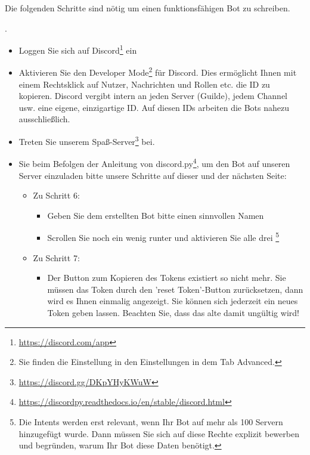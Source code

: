 \documentclass{ubo_tex_uebungszettel/uebungszettel}
\theoremstyle{definition}
\newcommand{\pp}[1]{\lpl{#1}}
\newcommand{\furl}[1]{\footnote{\url{#1}}}
\begin{document}
	\begin{aufg}[Vorbereitung]\quad
		
		\noindent Die folgenden Schritte sind nötig um einen funktionsfähigen Bot zu schreiben.
		
		\medskip
		
		\noindent{}.
		\begin{itemize}
			\item Loggen Sie sich auf Discord\furl{https://discord.com/app} ein
			
			\item Aktivieren Sie den Developer Mode\footnote{Sie finden die Einstellung in den Einstellungen in dem Tab  \glqq Advanced\grqq.} für Discord.
			Dies ermöglicht Ihnen mit einem Rechtsklick auf Nutzer, Nachrichten und Rollen etc. die ID zu kopieren.
			Discord vergibt intern an jeden Server (Guilde), jedem Channel usw. eine eigene, einzigartige ID. Auf diesen IDs arbeiten die Bots nahezu ausschließlich.
			
			\item Treten Sie unserem Spaß-Server\furl{https://discord.gg/DKpYHyKWuW} bei.
		\end{itemize}
		
		\pagebreak
		
		\noindent{}
		\begin{itemize}
			\item {} Sie beim Befolgen der Anleitung von discord.py\furl{https://discordpy.readthedocs.io/en/stable/discord.html}, um den Bot auf unseren Server einzuladen bitte unsere  Schritte auf dieser und der nächsten Seite:
			\begin{itemize}
				
				\item Zu Schritt 6:
				\begin{itemize}
					\item Geben Sie dem erstellten Bot bitte einen sinnvollen Namen
					\item Scrollen Sie noch ein wenig runter und aktivieren Sie alle drei \pp{Privileged Gateway Intents}\footnote{Die Intents werden erst relevant, wenn Ihr Bot auf mehr als 100 Servern hinzugefügt wurde. Dann müssen Sie sich auf diese Rechte explizit bewerben und begründen, warum Ihr Bot diese Daten benötigt.}
				\end{itemize}
				\item Zu Schritt 7:
				\begin{itemize}
					\item Der Button zum Kopieren des Tokens existiert so nicht mehr. Sie müssen das Token durch den 'reset Token'-Button zurücksetzen, dann wird es Ihnen einmalig angezeigt. Sie können sich jederzeit ein neues Token geben lassen. Beachten Sie, dass das alte damit ungültig wird!
				\end{itemize}
				

\end{itemize}
\end{itemize}
\end{aufg}
\end{document}
